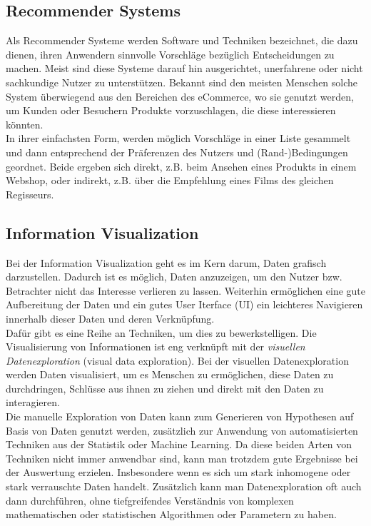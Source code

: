 		\subsection{Recommender Systems}
		Als Recommender Systeme werden Software und Techniken bezeichnet, die dazu
		dienen, ihren Anwendern sinnvolle Vorschläge bezüglich Entscheidungen zu machen. Meist sind diese Systeme darauf hin ausgerichtet, unerfahrene oder nicht sachkundige Nutzer zu unterstützen. \cite{Fra10}  Bekannt sind den meisten Menschen solche System überwiegend aus den Bereichen des eCommerce, wo sie genutzt werden, um Kunden oder Besuchern Produkte vorzuschlagen, die diese interessieren könnten.\\
		In ihrer einfachsten Form, werden möglich Vorschläge in einer Liste gesammelt und dann entsprechend der Präferenzen des Nutzers und (Rand-)Bedingungen geordnet. Beide ergeben sich direkt, z.B. beim Ansehen eines Produkts in einem Webshop, oder indirekt, z.B. über die Empfehlung eines Films des gleichen Regisseurs. \cite{Fra10} 
		
		\subsection{Information Visualization}
		Bei der Information Visualization geht es im Kern darum, Daten grafisch
		darzustellen. Dadurch ist es möglich, Daten anzuzeigen, um den
		Nutzer bzw. Betrachter nicht das Interesse verlieren zu lassen. Weiterhin ermöglichen eine gute Aufbereitung der Daten und ein
		gutes User Iterface (UI) ein leichteres Navigieren innerhalb dieser Daten und deren Verknüpfung.\\
		Dafür gibt es eine Reihe an Techniken, um dies zu bewerkstelligen. Die
		Visualisierung von Informationen ist eng verknüpft mit der \textit{visuellen
		Datenexploration} (visual data exploration).
		Bei der visuellen Datenexploration werden Daten visualisiert, um es Menschen zu
		ermöglichen, diese Daten zu durchdringen, Schlüsse aus ihnen zu ziehen und direkt mit den Daten zu interagieren. \cite{Kei02}\\ Die manuelle Exploration von Daten kann zum Generieren von Hypothesen auf Basis von Daten genutzt werden, zusätzlich zur Anwendung von automatisierten Techniken aus der Statistik oder Machine Learning. Da diese beiden Arten von Techniken nicht immer anwendbar sind, kann man trotzdem gute Ergebnisse bei der Auswertung erzielen. Insbesondere wenn es  sich um stark inhomogene oder stark verrauschte Daten handelt. Zusätzlich kann man Datenexploration oft auch dann durchführen, ohne tiefgreifendes Verständnis von komplexen  mathematischen oder statistischen Algorithmen oder Parametern zu haben. \cite{Kei02} 
		
